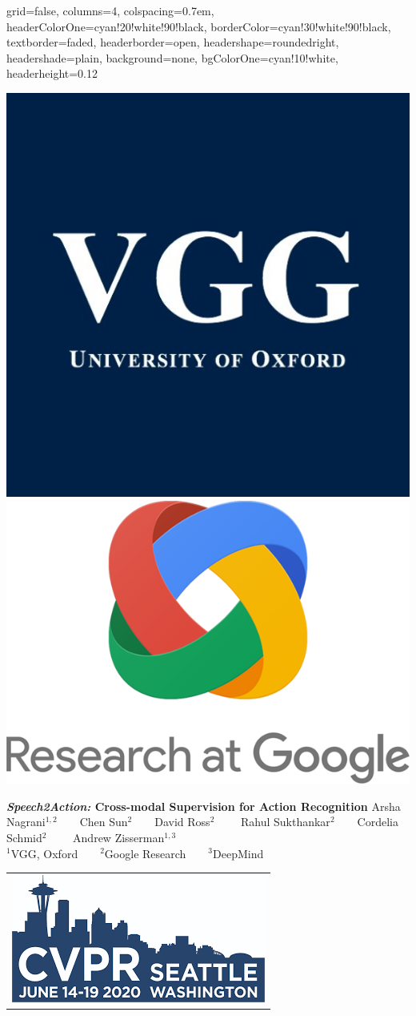 \documentclass[landscape,a0paper,fontscale=0.292]{baposter}
\begin{document}
\begin{poster}{
 grid=false,
 columns=4,
 colspacing=0.7em,
 headerColorOne=cyan!20!white!90!black,
 borderColor=cyan!30!white!90!black,
 textborder=faded,
 headerborder=open,
 headershape=roundedright,
 headershade=plain,
 background=none,
 bgColorOne=cyan!10!white,
 headerheight=0.12\textheight}
 {
      \includegraphics[width=0.07\linewidth]{VGG_logo.jpg}
      \makebox[0.005\textwidth]{} 
      \includegraphics[width=0.08\linewidth]{Google_Research.png}
      
    
 }
 {\sc\huge\bf \textit{Speech2Action:} Cross-modal Supervision for Action Recognition}
 {Arsha Nagrani$^{1,2}$~~~~Chen Sun$^2$~~~~David Ross$^2$ ~~~~Rahul Sukthankar$^2$~~~~Cordelia Schmid$^{2}$ ~~~~Andrew Zisserman$^{1,3}$ \\[0.2em]
$^1$VGG, Oxford~~~~$^2$Google Research~~~~$^3$DeepMind~~~~  }
 {
  \begin{tabular}{r}
    \includegraphics[width=0.14\linewidth]{CVPR_logo_2020.png}
  \end{tabular}
 }



\end{poster}
\end{document}
